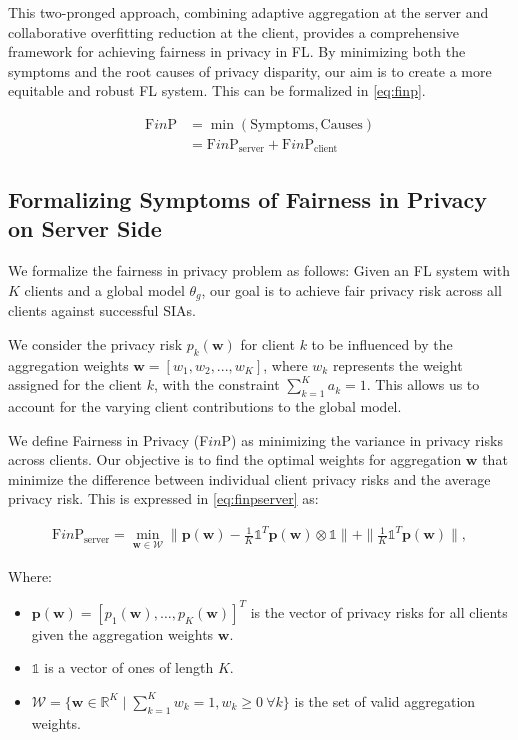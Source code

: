 This two-pronged approach, combining adaptive aggregation at the server and collaborative overfitting reduction at the client, provides a comprehensive framework for achieving fairness in privacy in FL. By minimizing both the symptoms and the root causes of privacy disparity, our aim is to create a more equitable and robust FL system. This can be formalized in \autoref{eq:finp}. 

\begin{align}\label{eq:finp}
\text{F}in\text{P} &= \min (\text{Symptoms}, \text{Causes}) \nonumber \\ 
&= \text{F}in\text{P}_\text{server} + \text{F}in\text{P}_\text{client}
\end{align}


\subsection{Formalizing Symptoms of Fairness in Privacy on Server Side}

We formalize the fairness in privacy problem as follows: Given an FL system with $K$ clients and a global model $\theta_g$, our goal is to achieve fair privacy risk across all clients against successful SIAs.

We consider the privacy risk $p_k(\mathbf{w})$ for client $k$ to be influenced by the aggregation weights $\mathbf{w} = [w_1, w_2, ..., w_K]$, where $w_k$ represents the weight assigned for the client $k$, with the constraint $\sum_{k=1}^{K} a_k = 1$. This allows us to account for the varying client contributions to the global model.

We define Fairness in Privacy (F$in$P) as minimizing the variance in privacy risks across clients. Our objective is to find the optimal weights for aggregation $\mathbf{w}$ that minimize the difference between individual client privacy risks and the average privacy risk. This is expressed in \autoref{eq:finpserver} as:


\begin{align}\label{eq:finpserver}
    \text{F}in\text{P}_\text{server} = \min_{\mathbf{w}\in \mathcal{W}} \| \mathbf{p}(\mathbf{w}) - \frac{1}{K} \mathds{1}^T \mathbf{p}(\mathbf{w}) \otimes \mathds{1}  \| + \|\frac{1}{K} \mathds{1}^T \mathbf{p}(\mathbf{w})\|,
\end{align}

Where:

\begin{itemize}
    \item $\mathbf{p}(\mathbf{w}) = [p_1(\mathbf{w}),\dots, p_K(\mathbf{w})]^T$ is the vector of privacy risks for all clients given the aggregation weights $\mathbf{w}$.
    \item $\mathds{1}$ is a vector of ones of length $K$.
    \item $\mathcal{W} = \{\mathbf{w} \in \mathbb{R}^K \mid \sum_{k=1}^{K} w_k = 1, w_k \geq 0 \ \forall k\}$ is the set of valid aggregation weights.
\end{itemize}

